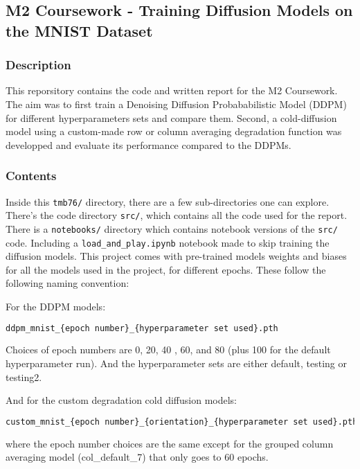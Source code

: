 \documentclass[12pt]{report} %
\begin{document}
\subsection{M2 Coursework - Training Diffusion Models on the MNIST Dataset}

\subsubsection{Description}
This reporsitory contains the code and written report for the M2 Coursework. The aim was to first train a Denoising Diffusion Probababilistic Model (DDPM) for different hyperparameters sets and compare them. Second, a cold-diffusion model using a custom-made row or column averaging degradation function was developped and evaluate its performance compared to the DDPMs.

\subsubsection{Contents}

Inside this \texttt{tmb76/} directory, there are a few sub-directories one can explore. There's the code directory \texttt{src/}, which contains all the code used for the report. There is a \texttt{notebooks/} directory which contains notebook versions of the \texttt{src/} code. Including a \texttt{load\_and\_play.ipynb} notebook made to skip training the diffusion models. This project comes with pre-trained models weights and biases for all the models used in the project, for different epochs. These follow the following naming convention:

For the DDPM models:
\begin{lstlisting}[language=bash]
ddpm_mnist_{epoch number}_{hyperparameter set used}.pth
\end{lstlisting}

Choices of epoch numbers are 0, 20, 40 , 60, and 80 (plus 100 for the default hyperparameter run). And the hyperparameter sets are either default, testing or testing2.

And for the custom degradation cold diffusion models:
\begin{lstlisting}[language=bash]
custom_mnist_{epoch number}_{orientation}_{hyperparameter set used}.pth
\end{lstlisting}

where the epoch number choices are the same except for the grouped column averaging model (col\_default\_7) that only goes to 60 epochs.
\end{document}
